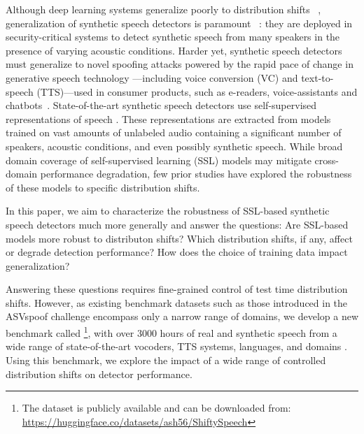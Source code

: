 Although deep learning systems generalize poorly to distribution shifts ~\cite{d2022underspecification, teney2022predictingunderstandingrecognizingaddressing}, generalization of synthetic speech detectors is paramount ~\cite{muller2022does,chen20_odyssey}: they are deployed in security-critical systems \cite{kassis2023breaking} to detect synthetic speech from many speakers in the presence of varying acoustic conditions. Harder yet, synthetic speech detectors must generalize to novel spoofing attacks powered by the rapid pace of change in generative speech technology \cite{marek2024audiodeepfakedetectionmodels, müller2024doesaudiodeepfakedetection}---including voice conversion (VC) and text-to-speech (TTS)---used in consumer products, such as e-readers, voice-assistants and chatbots~\cite{yang2024streamvcrealtimelowlatencyvoice, kameoka2018starganvcnonparallelmanytomanyvoice, choi2023dddmvcdecoupleddenoisingdiffusion, casanova2023yourttszeroshotmultispeakertts, qian2019autovczeroshotvoicestyle, kaneko2019cycleganvc2improvedcycleganbasednonparallel, bargum2023reimaginingspeechscopingreview}.
State-of-the-art synthetic speech detectors use self-supervised representations of speech \cite{tak2022automaticspeakerverificationspoofing, kang2024experimentalstudyenhancingvoice,wang2022investigatingselfsupervisedendsspeech}. These representations are extracted from models trained on vast amounts of unlabeled audio containing a significant number of speakers, acoustic conditions, and even possibly synthetic speech. While broad domain coverage of self-supervised learning (SSL) models may mitigate cross-domain performance degradation, few prior studies \cite{muller2024mlaad,muller2022does,khan2023battling} have explored the robustness of these models to specific distribution shifts.

In this paper, we aim to characterize the robustness of SSL-based synthetic speech detectors much more generally and answer the questions: Are SSL-based models more robust to distributon shifts? Which distribution shifts, if any, affect or degrade detection performance? How does the choice of training data impact generalization? 

Answering these questions requires fine-grained control of test time distribution shifts.
However, as existing benchmark datasets such as those introduced in the ASVspoof challenge encompass only a narrow range of domains, we develop a new benchmark called \methodName\footnote{The dataset is publicly available and can be downloaded from: \url{https://huggingface.co/datasets/ash56/ShiftySpeech}}, with over 3000 hours of real and synthetic speech from a wide range of state-of-the-art vocoders, TTS systems, languages, and domains \cite{wu15e_interspeech,Nautsch_2021,Liu_2023}. Using this benchmark, we explore the impact of a wide range of controlled distribution shifts on detector performance.


